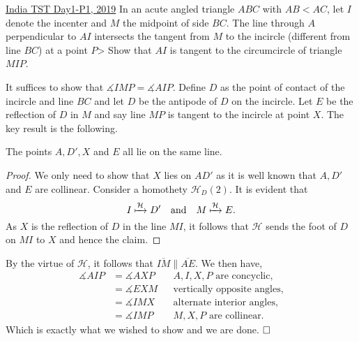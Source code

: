 \begin{problem}{11}{\href{https://artofproblemsolving.com/community/q2h1876785p35453764}{India TST Day1-P1, 2019}} 
	In an acute angled triangle $ABC$ with $AB < AC$, let $I$ denote the incenter and $M$ the midpoint of side $BC$. The line through $A$ perpendicular to $AI$ intersects the tangent from $M$ to the incircle (different from line $BC$) at a point $P$> Show that $AI$ is tangent to the circumcircle of triangle $MIP$.
	\begin{solution} It suffices to show that $\measuredangle IMP=\measuredangle AIP$. Define $D$ as the point of contact of the incircle and line $BC$ and let $D$ be the antipode of $D$ on the incircle. Let $E$ be the reflection of $D$ in $M$ and say line $MP$ is tangent to the incircle at point $X$. The key result is the following.

	\begin{numclaim}{1}
		The points $A, D', X$ and $E$ all lie on the same line.
	\end{numclaim}
	\begin{proof} We only need to show that $X$ lies on $AD'$ as it is well known that $A, D'$ and $E$ are collinear. Consider a homothety $\mathcal{H}_D(2)$. It is evident that
$$I\xmapsto{\mathcal{H}}D'\quad\text{and}\quad M\xmapsto{\mathcal{H}} E.$$As $X$ is the reflection of $D$ in the line $MI$, it follows that $\mathcal{H}$ sends the foot of $D$ on $MI$ to $X$ and hence the claim.
	\end{proof}

	By the virtue of $\mathcal{H}$, it follows that $\overline{IM}\parallel \overline{AE}$. We then have,
\begin{align*} \measuredangle AIP &= \measuredangle AXP && \text{$A, I, X, P$ are concyclic,}\\ &= \measuredangle EXM && \text{vertically opposite angles,}\\ &= \measuredangle IMX && \text{alternate interior angles,}\\ &= \measuredangle IMP && \text{$M, X, P$ are collinear.} \end{align*}Which is exactly what we wished to show and we are done. $\qedwhite$
	\end{solution}
\end{problem}
	
